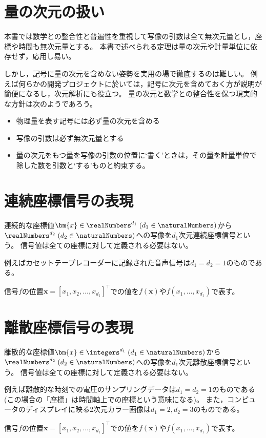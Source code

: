     \chapter{量の次元の扱い}
        本書では数学との整合性と普遍性を重視して写像の引数は全て無次元量とし，座標や時間も無次元量とする。
        本書で述べられる定理は量の次元や計量単位に依存せず，応用し易い。
        \par
        しかし，記号に量の次元を含めない姿勢を実用の場で徹底するのは難しい。
        例えば何らかの開発プロジェクトに於いては，記号に次元を含めておく方が説明が簡便になるし，次元解析にも役立つ。
        量の次元と数学との整合性を保つ現実的な方針は次のようであろう。
        \begin{itemize}
            \item 物理量を表す記号には必ず量の次元を含める
            \item 写像の引数は必ず無次元量とする
            \item 量の次元をもつ量を写像の引数の位置に‘書く’ときは，その量を計量単位で除した数を引数と‘する’ものと約束する。
        \end{itemize}
    \chapter{連続座標信号の表現}
        連続的な座標値$\bm{x}\in\realNumbers^{d_1}\;(d_1\in\naturalNumbers)$から$\realNumbers^{d_2}\;(d_2\in\naturalNumbers)$への写像を$d_1$次元連続座標信号という。
        信号値は全ての座標に対して定義される必要はない。
        \par
        例えばカセットテープレコーダーに記録された音声信号は$d_1=d_2=1$のものである。
        \par
        信号$f$の位置$\bm{x} = [x_1,x_2,\dots,x_{d_1}]^\top$での値を$f(\bm{x})$や$f(x_1,\dots,x_{d_1})$で表す。
    \chapter{離散座標信号の表現}
        離散的な座標値$\bm{x}\in\integers^{d_1}\;(d_1\in\naturalNumbers)$から$\realNumbers^{d_2}\;(d_2\in\naturalNumbers)$への写像を$d_1$次元離散座標信号という。
        信号値は全ての座標に対して定義される必要はない。
        \par
        例えば離散的な時刻での電圧のサンプリングデータは$d_1=d_2=1$のものである(この場合の「座標」は時間軸上での座標という意味になる)。
        また，コンピュータのディスプレイに映る2次元カラー画像は$d_1=2,d_2=3$のものである。
        \par
        信号$f$の位置$\bm{x} = [x_1,x_2,\dots,x_{d_1}]^\top$での値を$f(\bm{x})$や$f(x_1,\dots,x_{d_1})$で表す。
